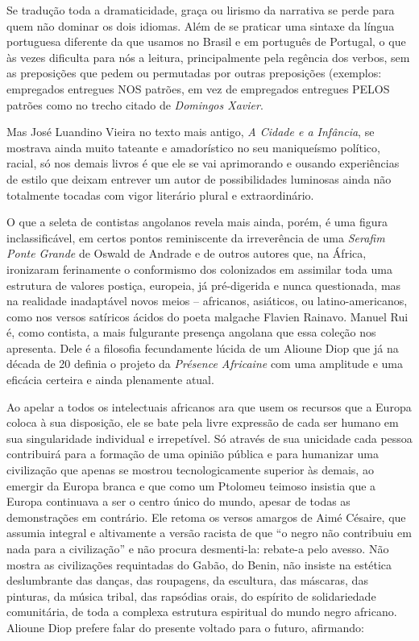 \documentclass[
  letterpaper,
  DIV=11,
  numbers=noendperiod]{scrreprt}
\begin{document}
Se tradução toda a dramaticidade, graça ou lirismo da narrativa se perde
para quem não dominar os dois idiomas. Além de se praticar uma sintaxe
da língua portuguesa diferente da que usamos no Brasil e em português de
Portugal, o que às vezes dificulta para nós a leitura, principalmente
pela regência dos verbos, sem as preposições que pedem ou permutadas por
outras preposições (exemplos: empregados entregues NOS patrões, em vez
de empregados entregues PELOS patrões como no trecho citado de
\emph{Domingos Xavier}.

Mas José Luandino Vieira no texto mais antigo, \emph{A Cidade e a
Infância}, se mostrava ainda muito tateante e amadorístico no seu
maniqueísmo político, racial, só nos demais livros é que ele se vai
aprimorando e ousando experiências de estilo que deixam entrever um
autor de possibilidades luminosas ainda não totalmente tocadas com vigor
literário plural e extraordinário.

O que a seleta de contistas angolanos revela mais ainda, porém, é uma
figura inclassificável, em certos pontos reminiscente da irreverência de
uma \emph{Serafim Ponte Grande} de Oswald de Andrade e de outros autores
que, na África, ironizaram ferinamente o conformismo dos colonizados em
assimilar toda uma estrutura de valores postiça, europeia, já
pré-digerida e nunca questionada, mas na realidade inadaptável novos
meios -- africanos, asiáticos, ou latino-americanos, como nos versos
satíricos ácidos do poeta malgache Flavien Rainavo. Manuel Rui é, como
contista, a mais fulgurante presença angolana que essa coleção nos
apresenta. Dele é a filosofia fecundamente lúcida de um Alioune Diop que
já na década de 20 definia o projeto da \emph{Présence Africaine} com
uma amplitude e uma eficácia certeira e ainda plenamente atual.

Ao apelar a todos os intelectuais africanos ara que usem os recursos que
a Europa coloca à sua disposição, ele se bate pela livre expressão de
cada ser humano em sua singularidade individual e irrepetível. Só
através de sua unicidade cada pessoa contribuirá para a formação de uma
opinião pública e para humanizar uma civilização que apenas se mostrou
tecnologicamente superior às demais, ao emergir da Europa branca e que
como um Ptolomeu teimoso insistia que a Europa continuava a ser o centro
único do mundo, apesar de todas as demonstrações em contrário. Ele
retoma os versos amargos de Aimé Césaire, que assumia integral e
altivamente a versão racista de que ``o negro não contribuiu em nada
para a civilização'' e não procura desmenti-la: rebate-a pelo avesso.
Não mostra as civilizações requintadas do Gabão, do Benin, não insiste
na estética deslumbrante das danças, das roupagens, da escultura, das
máscaras, das pinturas, da música tribal, das rapsódias orais, do
espírito de solidariedade comunitária, de toda a complexa estrutura
espiritual do mundo negro africano. Alioune Diop prefere falar do
presente voltado para o futuro, afirmando:
\end{document}
